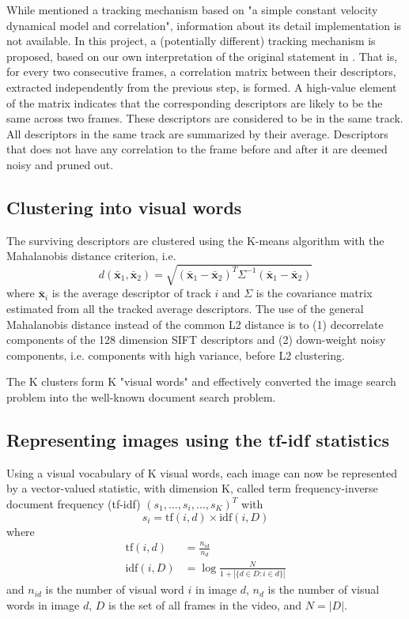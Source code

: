 \documentclass[conference]{IEEEtran}
\begin{document}
While \cite{sivic2003video} mentioned a tracking mechanism based on "a simple constant velocity dynamical model and correlation", 
information about its detail implementation is not available. In this project, a (potentially different) tracking mechanism is proposed, based on our own 
interpretation of the original statement in \cite{sivic2003video}. That is, for every two consecutive frames, a correlation matrix between 
their descriptors, extracted independently from the previous step, is formed. 
A high-value element of the matrix 
indicates that the corresponding descriptors are likely to be the same across two frames. These descriptors are considered to be in the same track. 
All descriptors in the same track are summarized by their average. Descriptors that does not 
have any correlation to the frame before and after it are deemed noisy and pruned out.

\subsection{Clustering into visual words}
The surviving descriptors are clustered using the K-means algorithm with the Mahalanobis distance criterion, i.e.
$$
d(\bar{\mathbf{x}}_1, \bar{\mathbf{x}}_2) = \sqrt{(\bar{\mathbf{x}}_1  - \bar{\mathbf{x}}_2)^T\Sigma^{-1}
(\bar{\mathbf{x}}_1  - \bar{\mathbf{x}}_2)}
$$
where $\bar{\mathbf{x}}_i$ is the average descriptor of track $i$ and $\Sigma$ is the covariance matrix estimated from 
all the tracked  average descriptors. The use of the general Mahalanobis distance instead of the common L2 distance is to (1) decorrelate
components of the 128 dimension SIFT descriptors and (2) down-weight noisy components, i.e. components with high variance, before L2 clustering.


The K clusters form K "visual words" and effectively converted the image search problem into the well-known document search problem.

\subsection{Representing images using the tf-idf statistics}
Using a visual vocabulary of K visual words, each image can now be represented by a vector-valued statistic, with dimension K, called term 
frequency-inverse document frequency (tf-idf) \cite{salton1983introduction, salton1988term} $(s_1, \dots, s_i, \dots, s_K)^T$ with
$$
s_i = \text{tf}(i, d) \times \text{idf}(i, D)
$$
where 
$$
\begin{aligned}
\text{tf}(i, d) &= \frac{n_{id}}{n_d}\\
\text{idf}(i, D) &= \log\frac{N}{1+|\{d\in D: i\in d\}|}
\end{aligned}
$$
and $n_{id}$ is the number of visual word $i$ in image $d$, $n_d$ is the number of visual words in image $d$, $D$ is the set of all frames
in the video, and $N = |D|$.
\end{document}
